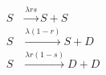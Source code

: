 \documentclass[10pt]{article}
\begin{document}
\begin{align*}S&\xrightarrow{\lambda rs} S+S\\
S&\xrightarrow{\lambda (1-r)} S+D\\
S&\xrightarrow{\lambda r(1-s)} D+D
\end{align*}
\end{document}
